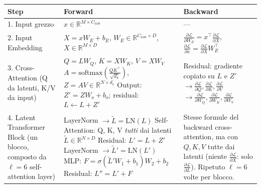 \documentclass[
  11pt,
]{article}
\begin{document}
{\small
\begin{longtable}{@{}p{2.8cm} p{5.5cm} p{5.5cm}@{}}
\toprule
\textbf{Step} & \textbf{Forward} & \textbf{Backward} \\
\midrule
\endhead
1. Input grezzo & $x \in \mathbb{R}^{M \times C_{\text{raw}}}$ & --- \\[4pt]
2. Input Embedding & $X = x W_E + b_E$, \newline $W_E \in \mathbb{R}^{C_{\text{raw}} \times D}$, \newline $X \in \mathbb{R}^{M \times D}$ & $\frac{\partial \mathcal{L}}{\partial W_E} = x^\top \frac{\partial \mathcal{L}}{\partial X}$, \newline $\frac{\partial \mathcal{L}}{\partial x} = \frac{\partial \mathcal{L}}{\partial X} W_E^\top$ \\[4pt]
3. Cross-Attention \newline (Q da latenti, K/V da input) & $Q = L W_Q$, $K = X W_K$, $V = X W_V$ \newline $A = \text{softmax}\!\left(\frac{QK^\top}{\sqrt{d_k}}\right)$, $Z = AV \in \mathbb{R}^{N \times d_v}$ \newline Output: $Z' = Z W_o + b_o$; residual: $L \leftarrow L + Z'$ & Residual: gradiente copiato su $L$ e $Z'$ \newline $\to \frac{\partial\mathcal{L}}{\partial Q}, \frac{\partial\mathcal{L}}{\partial K}, \frac{\partial\mathcal{L}}{\partial V}$ \newline $\to \frac{\partial\mathcal{L}}{\partial W_Q}, \frac{\partial\mathcal{L}}{\partial W_K}, \frac{\partial\mathcal{L}}{\partial W_V}$ \\[4pt]
4. Latent Transformer Block \newline (un blocco, composto da $\ell = 6$ self-attention layer) & LayerNorm $\to \tilde{L} = \text{LN}(L)$ \newline Self-Attention: Q, K, V \emph{tutti} dai latenti $\tilde{L} \in \mathbb{R}^{N \times D}$ \newline Residual: $L' = L + Z'$ \newline LayerNorm $\to \tilde{L}' = \text{LN}(L')$ \newline MLP: $F = \sigma(\tilde{L}' W_1 + b_1) W_2 + b_2$ \newline Residual: $L'' = L' + F$ & Stesse formule del backward cross-attention, ma con $Q, K, V$ tutte dai latenti (niente $\frac{\partial\mathcal{L}}{\partial X}$: solo $\frac{\partial\mathcal{L}}{\partial L}$). \newline Ripetuto $\ell = 6$ volte per blocco. \\[4pt]

\end{longtable}}
\end{document}
